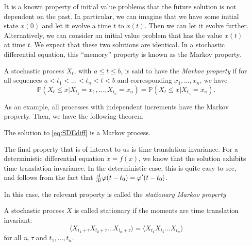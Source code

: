 \documentclass[prb,12pt]{revtex4-2}
\theoremstyle{definition}
\theoremstyle{definition}
\theoremstyle{definition}
\begin{document}
It is a known property of initial value problems that the future solution is not dependent on the past. In particular, we can imagine that we have some initial state $x(0)$ and let it evolve a time $t$ to $x(t)$. Then we can let it evolve further. Alternatively, we can consider an initial value problem that has the value $x(t)$ at time $t$. We expect that these two solutions are identical. In a stochastic differential equation, this ``memory'' property is known as the Markov property. 
\begin{Definition}
	A stochastic process $X_t$, with $a\le t \le b$, is said to have the \emph{Markov property} if for all sequences $a < t_1 < \dots < t_n < t < b$ and corresponding $x_1, \dots, x_n$, we have
	\[
	\mathbb{P}(X_t\le x|X_{t_1}=x_1, \dots, X_{t_n}=x_n) = \mathbb{P}(X_t\le x|X_{t_n}=x_n)
	.\] 
\end{Definition}
As an example, all processes with independent increments have the Markov property. Then, we have the following theorem

\begin{Theorem}
	The solution to \eqref{eq:SDEdiff} is a Markov process.
\end{Theorem}

The final property that is of interest to us is time translation invariance. For a deterministic differential equation $\dot{x} = f(x)$, we know that the solution exhibits time translation invariance. In the deterministic case, this is quite easy to see, and follows from the fact that $\dv{t}\varphi(t - t_0) = \varphi'(t-t_0)$. 

In this case, the relevant property is called the \emph{stationary Markov property}
\begin{Definition}
	A stochastic process $X$ is called stationary if the moments are time translation invariant:
	\[
	\langle X_{t_1+\tau}X_{t_2+\tau}\dots X_{t_n+\tau}\rangle = \langle X_{t_1}X_{t_2}\dots X_{t_n}\rangle
	\]
	for all $n,\tau$ and $t_1, \dots, t_n$.
\end{Definition}
\end{document}
